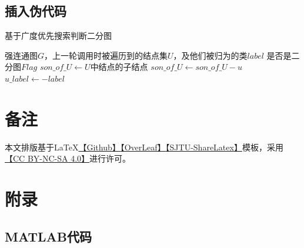 \documentclass[a4paper]{article}
\begin{document}
\subsection{插入伪代码}

\begin{algorithm}  
    \caption{基于广度优先搜索判断二分图}  
    \begin{algorithmic}[1] 
        \Require  强连通图$G$，上一轮调用时被遍历到的结点集$U$，及他们被归为的类$label$
        \Ensure 是否是二分图$Flag$
            \State $son\_of\_U\gets U$中结点的子结点
            \State
            \State {}
            \Else {}
            \State $son\_of\_U\gets son\_of\_U - u$
            \Else {}
            \State $u\_label\gets -label$
            \EndIf
            \EndIf
            \EndForEach
            \State
            \State{}
            \Else {}
            \State {}
            \EndIf
        \EndFunction  
    \end{algorithmic}  
\end{algorithm}

\newpage
\section*{备注}
本文排版基于\LaTeX{}\href{https://github.com/JamesZhutheThird/A-Simple-LaTeX-Template}{【Github】}\href{https://cn.overleaf.com/read/mxmypkyfrzpz}{【OverLeaf】}\href{https://latex.sjtu.edu.cn/read/ndjrkpksrfzn}{【SJTU-ShareLatex】}模板，采用\href{http://creativecommons.org/licenses/by-nc-sa/4.0/}{【CC BY-NC-SA 4.0】}进行许可。





\section*{附录}
\subsection*{MATLAB代码}

\end{document}
